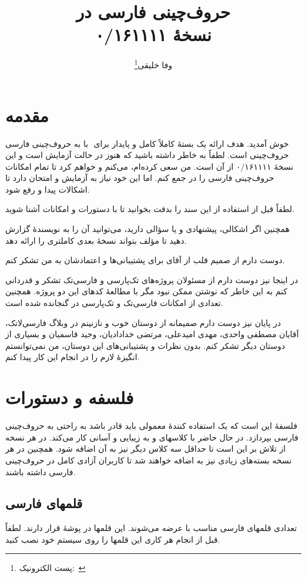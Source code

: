\documentclass[a4paper,11pt]{report}
\title{حروف‌چینی فارسی در \LR{\XePersian}\\[0.2cm]نسخهٔ ۰/۱۶۱۱۱۱}
\author{وفا خلیقی\thanks{پست الکترونیک:~\LR{vafa.khalighi@students.mq.edu.au}}}
\begin{document}
\maketitle
\tableofcontents
\chapter{مقدمه}
به حروف‌چینی فارسی ‪ ‬با ‪\LR{\XePersian} ‬خوش آمدید. هدف \LR{\XePersian} ارائه یک بستهٔ کاملاً کامل و پایدار برای حروف‌چینی است. لطفاً به خاطر داشته باشید که \LR{\XePersian} هنوز در حالت آزمایش است و این نسخهٔ ۰/۱۶۱۱۱۱ از آن است. من سعی کرده‌ام، می‌کنم و خواهم کرد تا تمام امکانات حروف‌چینی فارسی را در \LR{\XePersian} جمع کنم. اما این خود نیاز به آزمایش و امتحان دارد تا اشکالات پیدا و رفع شود.


لطفاً قبل از استفاده از \LR{\XePersian} این سند را بدقت بخوانید تا با دستورات و امکانات \LR{\XePersian} آشنا شوید.

همچنین اگر اشکالی، پیشنهادی و یا سؤالی دارید، می‌توانید آن را به نویسندهٔ \LR{\XePersian} گزارش دهید تا مؤلف \LR{\XePersian} بتواند نسخهٔ بعدی کاملتری را ارائه دهد.

دوست دارم از صمیم قلب از آقای  برای پشتیبانی‌ها و اعتمادشان به من تشکر کنم.

در اینجا نیز دوست دارم از مسئولان پروژه‌های تک‌پارسی و فارسی‌تک تشکر و قدردانی کنم به این خاطر که نوشتن \LR{\XePersian} ممکن نبود مگر با مطالعهٔ کدهای این دو پروژه. همچنین تعدادی از امکانات فارسی‌تک و  تک‌پارسی در \LR{\XePersian} گنجانده شده است.

در پایان نیز دوست دارم صمیمانه از دوستان خوب و نازنینم در وبلاگ فارسی‌لاتک، آقایان مصطفی واحدی، مهدی امیدعلی، مرتضی خدادادیان، وحید قاسمیان و بسیاری از دوستان دیگر تشکر کنم. بدون نظرات و پشتیبانی‌های این دوستان، من نمی‌توانستم انگیزهٔ لازم را در انجام این کار پیدا کنم.
\chapter{فلسفه و دستورات}
فلسفهٔ \LR{\XePersian} این است که یک استفاده کنندهٔ معمولی باید قادر باشد به راحتی به حروف‌چینی فارسی بپردازد. در حال حاضر \LR{\XePersian} با کلاسهای  و  به زیبایی و آسانی کار می‌کند. در هر نسخه از \LR{\XePersian} تلاش بر این است تا حداقل سه کلاس دیگر نیز به آن اضافه شود. همچنین در هر نسخه بسته‌های زیادی نیز به \LR{\XePersian} اضافه خواهند شد تا کاربران آزادی کامل در حروف‌چینی فارسی داشته باشند.

\section{قلمهای فارسی}
تعدادی قلمهای فارسی مناسب با \LR{\XePersian} عرضه می‌شوند. این قلمها در پوشهٔ  قرار دارند. لطفاً قبل از انجام هر کاری این قلمها را روی سیستم خود نصب کنید.
\end{document}
